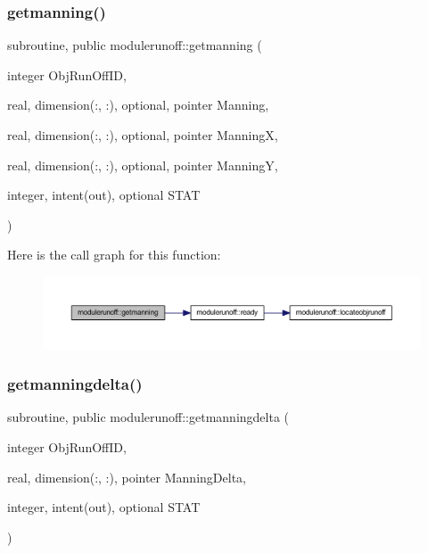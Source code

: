 \subsubsection{\texorpdfstring{getmanning()}{getmanning()}}
{\footnotesize\ttfamily subroutine, public modulerunoff\+::getmanning (\begin{DoxyParamCaption}\item[{integer}]{Obj\+Run\+Off\+ID,  }\item[{real, dimension(\+:, \+:), optional, pointer}]{Manning,  }\item[{real, dimension(\+:, \+:), optional, pointer}]{ManningX,  }\item[{real, dimension(\+:, \+:), optional, pointer}]{ManningY,  }\item[{integer, intent(out), optional}]{S\+T\+AT }\end{DoxyParamCaption})}

Here is the call graph for this function\+:\nopagebreak
\begin{figure}[H]
\begin{center}
\leavevmode
\includegraphics[width=350pt]{namespacemodulerunoff_a2cad42fe7c6c24a46f9a75f3528e8abb_cgraph}
\end{center}
\end{figure}
\mbox{\label{namespacemodulerunoff_a9ca63f5612ab734b77497c2eca2c05bd}} 
\subsubsection{\texorpdfstring{getmanningdelta()}{getmanningdelta()}}
{\footnotesize\ttfamily subroutine, public modulerunoff\+::getmanningdelta (\begin{DoxyParamCaption}\item[{integer}]{Obj\+Run\+Off\+ID,  }\item[{real, dimension(\+:, \+:), pointer}]{Manning\+Delta,  }\item[{integer, intent(out), optional}]{S\+T\+AT }\end{DoxyParamCaption})}

